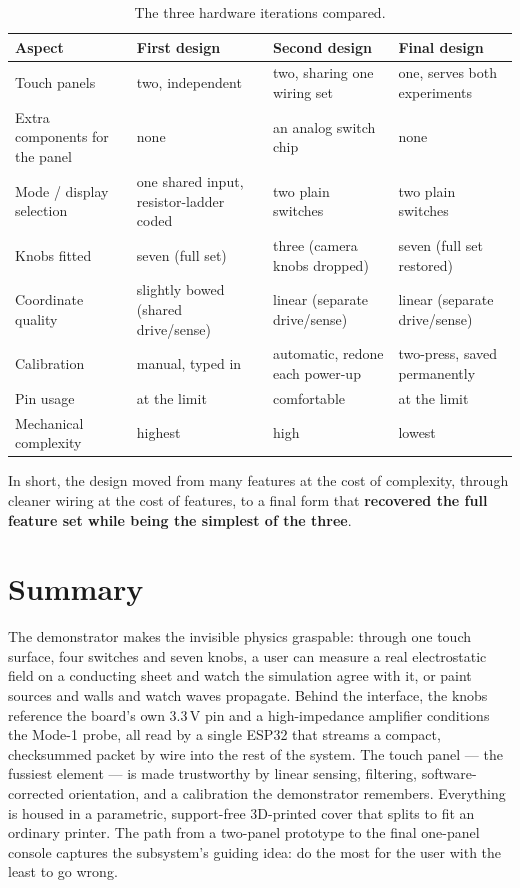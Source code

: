 \documentclass[11pt]{report}
\begin{document}
\begin{table}[ht]
\centering
\footnotesize
\renewcommand{\arraystretch}{1.3}
\begin{tabularx}{\textwidth}{@{}>{\raggedright\arraybackslash}p{2.7cm}
  >{\raggedright\arraybackslash}X
  >{\raggedright\arraybackslash}X
  >{\raggedright\arraybackslash}X@{}}
\toprule
\textbf{Aspect} & \textbf{First design} & \textbf{Second design} & \textbf{Final design} \\
\midrule
Touch panels & two, independent & two, sharing one wiring set & one, serves both experiments \\
Extra components for the panel & none & an analog switch chip & none \\
Mode / display selection & one shared input, resistor-ladder coded & two plain switches & two plain switches \\
Knobs fitted & seven (full set) & three (camera knobs dropped) & seven (full set restored) \\
Coordinate quality & slightly bowed (shared drive/sense) & linear (separate drive/sense) & linear (separate drive/sense) \\
Calibration & manual, typed in & automatic, redone each power-up & two-press, saved permanently \\
Pin usage & at the limit & comfortable & at the limit \\
Mechanical complexity & highest & high & lowest \\
\bottomrule
\end{tabularx}
\caption{The three hardware iterations compared.}
\label{tab:compare}
\end{table}

In short, the design moved from many features at the cost of complexity, through cleaner wiring at the cost of features, to a final form that \textbf{recovered the full feature set while being the simplest of the three}.

\section{Summary}

The demonstrator makes the invisible physics graspable: through one touch surface, four switches and seven knobs, a user can measure a real electrostatic field on a conducting sheet and watch the simulation agree with it, or paint sources and walls and watch waves propagate. Behind the interface, the knobs reference the board's own 3.3\,V pin and a high-impedance amplifier conditions the Mode-1 probe, all read by a single ESP32 that streams a compact, checksummed packet by wire into the rest of the system. The touch panel --- the fussiest element --- is made trustworthy by linear sensing, filtering, software-corrected orientation, and a calibration the demonstrator remembers. Everything is housed in a parametric, support-free 3D-printed cover that splits to fit an ordinary printer. The path from a two-panel prototype to the final one-panel console captures the subsystem's guiding idea: do the most for the user with the least to go wrong.
\end{document}
